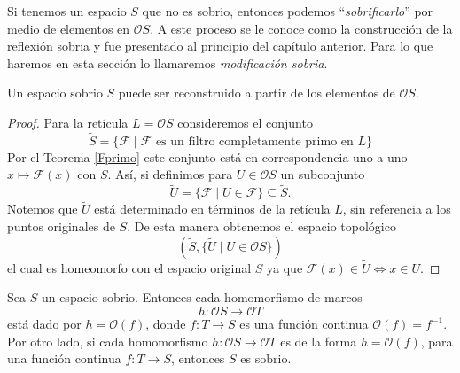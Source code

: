 Si tenemos un espacio $S$ que no es sobrio, entonces podemos ``\emph{sobrificarlo}'' por medio de elementos en $\mathcal{O}S$. A este proceso se le conoce como la construcción de la reflexión sobria y fue presentado al principio del capítulo anterior. 
Para lo que haremos en esta sección lo llamaremos \emph{modificación sobria}.

\begin{cor}\label{Modsobria}
    Un espacio sobrio $S$ puede ser reconstruido a partir de los elementos de $\mathcal{O}S$.  
\end{cor}

\begin{proof}
    Para la retícula $L=\mathcal{O}S$ consideremos el conjunto 
    \[
    \tilde{S}=\{\mathcal{F}\mid \mathcal{F}\mbox{ es un filtro completamente primo en }L\}
    \]
    Por el Teorema \ref{Fprimo} este conjunto está en correspondencia uno a uno $x\mapsto \mathcal{F}(x)$ con $S$. Así, si definimos para $U\in \mathcal{O}S$ un subconjunto 
    \[
    \tilde{U}=\{\mathcal{F}\mid U\in\mathcal{F}\}\subseteq \tilde{S}.
    \]
    Notemos que $\tilde{U}$ está determinado en términos de la retícula $L$, sin referencia a los puntos originales de $S$. De esta manera obtenemos el espacio topológico 
    \[
    (\tilde{S},\{\tilde{U}\mid U\in\mathcal{O}S\})
    \]
    el cual es homeomorfo con el espacio original $S$ ya que $\mathcal{F}(x)\in \tilde{U}\Leftrightarrow x\in U$.
\end{proof}

\begin{thm}
    Sea $S$ un espacio sobrio. Entonces cada homomorfismo de marcos 
    \[
    h\colon \mathcal{O}S\to \mathcal{O}T
    \]
    está dado por $h=\mathcal{O}(f)$, donde $f\colon T\to S$ es una función continua $\mathcal{O}(f)=f^{-1}$. Por otro lado, si cada homomorfismo $h\colon \mathcal{O}S\to \mathcal{O}T$ es de la forma $h=\mathcal{O}(f)$, para una función  continua $f\colon T\to S$, entonces $S$ es sobrio.
\end{thm}

